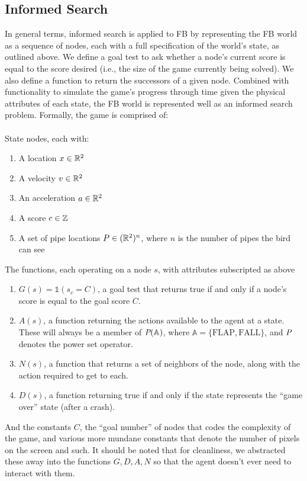 \documentclass[11pt]{article}
\begin{document}
\subsection{Informed Search}
In general terms, informed search is applied to FB by representing the FB
world as a sequence of nodes, each with a full specification of the world's state,
as outlined above. We define a goal test to ask whether a node's current score
is equal to the score desired (i.e., the size of the game currently being solved).
We also define a function to return the successors of a given node. Combined with
functionality to simulate the game's progress through time given the physical
attributes of each state, the FB world is represented well as an informed
search problem. Formally, the game is comprised of:
\\\\State nodes, each with:
\begin{enumerate}
    \item A location $x \in \mathbb{R}^2$
    \item A velocity $v \in \mathbb{R}^2$
    \item An acceleration $a \in \mathbb{R}^2$
    \item A score $c \in \mathbb{Z}$
    \item A set of pipe locations $P \in (\mathbb{R}^2)^n$, where $n$ is the
    number of pipes the bird can see
\end{enumerate}
The functions, each operating on a node $s$, with attributes subscripted as above
\begin{enumerate}
    \item $G(s) = \mathbb{1}(s_c = C)$, a goal test that returns true if and only if
    a node's score is equal to the goal score $C$.
    \item $A(s)$, a function returning the actions available to the agent at
        a state. These    will always be a member of $\emph{P} (\mathbb{A})$,
        where $\mathbb{A} = \{\text{FLAP}, \text{FALL}\}$, and $\emph{P}$ denotes
        the power set operator.
    \item $N(s)$, a function that returns a set of neighbors of the node, along
    with the action required to get to each.
    \item $D(s)$, a function returning true if and only if the state represents the
    ``game over'' state (after a crash).
\end{enumerate}
And the constants $C$, the ``goal number'' of nodes that codes the complexity of the
game, and various more mundane constants that denote the number of pixels on the screen
and such. It should be noted that for cleanliness, we abstracted these away into the
functions $G, D, A, N$ so that the agent doesn't ever need to interact with them.
\end{document}
